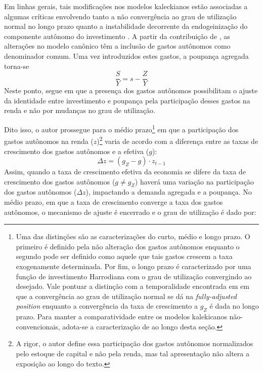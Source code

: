 Em linhas gerais, tais modificações nos modelos kaleckianos estão associadas a algumas críticas envolvendo tanto a não convergência ao grau de utilização normal no longo prazo quanto a instabilidade decorrente da endogeinização do componente autônomo do investimento \cites{dallery_kaleckian_2007}{skott_theoretical_2012}{hein_harrodian_2012}.
A partir da contribuição de \textcite{allain_tackling_2015}, as alterações no modelo canônico têm a inclusão de gastos autônomos como denominador comum.
Uma vez introduzidos estes gastos, a poupança agregada torna-se
$$
\frac{S}{Y} = s - \frac{Z}{Y}
$$
Neste ponto, \textcite[p.~10]{allain_tackling_2015} segue \textcite{serrano_sraffian_1995} em que a presença dos gastos autônomos possibilitam o ajuste da identidade entre investimento e poupança pela participação desses gastos na renda e não por mudanças no grau de utilização. 

Dito isso, o autor prossegue para o médio prazo\footnote{
	Uma das distinções \textcite{allain_tackling_2015} são as caracterizações do curto, médio e longo prazo. O primeiro é definido pela não alteração dos gastos autônomos enquanto o segundo pode ser definido como aquele que tais gastos crescem a taxa exogenamente determinada. Por fim, o longo prazo é caracterizado por uma função de investimento Harrodiana com o grau de utilização convergindo ao desejado. Vale pontuar a distinção com a temporalidade encontrada em \textcite{freitas_growth_2015} em que a convergência ao grau de utilização normal se dá na \textit{fully-adjusted position} enquanto a convergência da taxa de crescimento a $g_Z$ é dada no longo prazo. Para manter a comparatividade entre os modelos kalekicanos não-convencionais, adota-se a caracterização de \textcite{allain_tackling_2015} ao longo desta seção.
} em que a participação dos gastos autônomos na renda ($z$)\footnote{A rigor, o autor define essa participação dos gastos autônomos normalizados pelo estoque de capital e não pela renda, mas tal apresentação não altera a exposição ao longo do texto.} varia de acordo com a diferença entre as taxas de crescimento dos gastos autônomos e a efetiva ($g$):
\begin{equation}
\Delta z = (g_Z - g)\cdot z_{t-1}
\end{equation}
Assim, quando a taxa de crescimento efetiva da economia se difere da taxa de crescimento dos gastos autônomos ($g\neq g_Z$)  haverá uma variação na participação dos gastos autônomos ($\Delta z$), impactando a demanda agregada e a poupança. No médio prazo, em que a taxa de crescimento converge a taxa dos gastos autônomos, o mecanismo de ajuste é encerrado e o grau de utilização é dado por:

